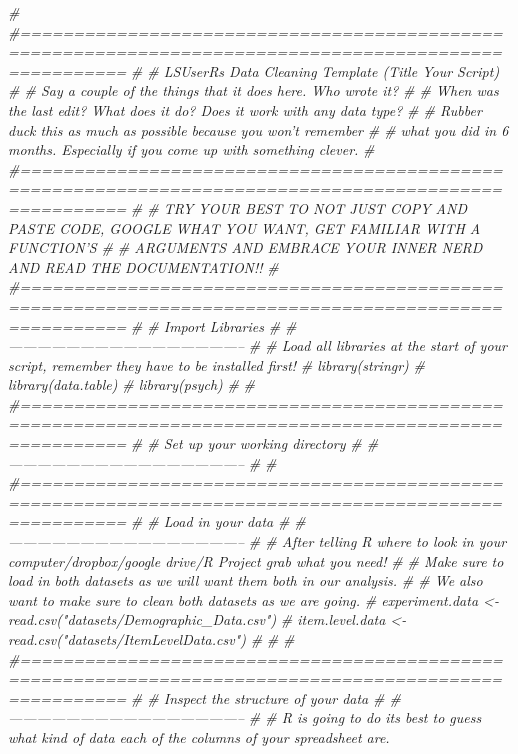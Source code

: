 \documentclass[]{book}
\newenvironment{Shaded}{\begin{snugshade}}{\end{snugshade}}
\newcommand{\CommentTok}[1]{\textcolor[rgb]{0.56,0.35,0.01}{\textit{#1}}}
\theoremstyle{definition}
\theoremstyle{definition}
\theoremstyle{definition}
\theoremstyle{remark}
\begin{document}
\begin{Shaded}
\begin{Highlighting}[]
\CommentTok{# #======================================================================================================}
\CommentTok{# # LSUserRs Data Cleaning Template (Title Your Script)}
\CommentTok{# # Say a couple of the things that it does here. Who wrote it?}
\CommentTok{# # When was the last edit? What does it do? Does it work with any data type?}
\CommentTok{# # Rubber duck this as much as possible because you won't remember}
\CommentTok{# # what you did in 6 months. Especially if you come up with something clever.}
\CommentTok{# #======================================================================================================}
\CommentTok{# # TRY YOUR BEST TO NOT JUST COPY AND PASTE CODE, GOOGLE WHAT YOU WANT, GET FAMILIAR WITH A FUNCTION'S}
\CommentTok{# # ARGUMENTS AND EMBRACE YOUR INNER NERD AND READ THE DOCUMENTATION!! }
\CommentTok{# #======================================================================================================}
\CommentTok{# # Import Libraries }
\CommentTok{# #--------------------------------------------------}
\CommentTok{# # Load all libraries at the start of your script, remember they have to be installed first! }
\CommentTok{# library(stringr)}
\CommentTok{# library(data.table)}
\CommentTok{# library(psych)}
\CommentTok{# }
\CommentTok{# #======================================================================================================}
\CommentTok{# # Set up your working directory}
\CommentTok{# #--------------------------------------------------}
\CommentTok{# }
\CommentTok{# #======================================================================================================}
\CommentTok{# # Load in your data}
\CommentTok{# #--------------------------------------------------}
\CommentTok{# # After telling R where to look in your computer/dropbox/google drive/R Project grab what you need!}
\CommentTok{# # Make sure to load in both datasets as we will want them both in our analysis.}
\CommentTok{# # We also want to make sure to clean both datasets as we are going. }
\CommentTok{# experiment.data <- read.csv("datasets/Demographic_Data.csv")}
\CommentTok{# item.level.data <- read.csv("datasets/ItemLevelData.csv")}
\CommentTok{# }
\CommentTok{# }
\CommentTok{# #======================================================================================================}
\CommentTok{# # Inspect the structure of your data}
\CommentTok{# #--------------------------------------------------}
\CommentTok{# # R is going to do its best to guess what kind of data each of the columns of your spreadsheet are.}

\end{Highlighting}
\end{Shaded}
\end{document}
